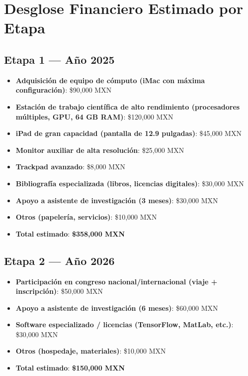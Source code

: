 \documentclass[12pt]{article}
\begin{document}
\section{Desglose Financiero Estimado por Etapa}

\subsection*{Etapa 1 — Año 2025}
\begin{itemize}
  \item \textbf{Adquisición de equipo de cómputo (iMac con máxima configuración)}: \$90,000 MXN
  \item \textbf{Estación de trabajo científica de alto rendimiento (procesadores múltiples, GPU, 64 GB RAM)}: \$120,000 MXN
  \item \textbf{iPad de gran capacidad (pantalla de 12.9 pulgadas)}: \$45,000 MXN
  \item \textbf{Monitor auxiliar de alta resolución}: \$25,000 MXN
  \item \textbf{Trackpad avanzado}: \$8,000 MXN
  \item \textbf{Bibliografía especializada (libros, licencias digitales)}: \$30,000 MXN
  \item \textbf{Apoyo a asistente de investigación (3 meses)}: \$30,000 MXN
  \item \textbf{Otros (papelería, servicios)}: \$10,000 MXN
  \item \textbf{Total estimado}: \textbf{\$358,000 MXN}
\end{itemize}

\subsection*{Etapa 2 — Año 2026}
\begin{itemize}
  \item \textbf{Participación en congreso nacional/internacional (viaje + inscripción)}: \$50,000 MXN
  \item \textbf{Apoyo a asistente de investigación (6 meses)}: \$60,000 MXN
  \item \textbf{Software especializado / licencias (TensorFlow, MatLab, etc.)}: \$30,000 MXN
  \item \textbf{Otros (hospedaje, materiales)}: \$10,000 MXN
  \item \textbf{Total estimado}: \textbf{\$150,000 MXN}
\end{itemize}
\end{document}

